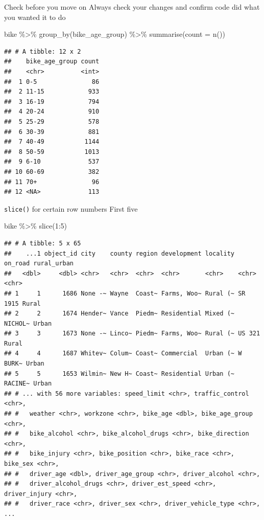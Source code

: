 \documentclass[
  ignorenonframetext,
]{beamer}
\newenvironment{Shaded}{\begin{snugshade}}{\end{snugshade}}
\newcommand{\AttributeTok}[1]{\textcolor[rgb]{0.77,0.63,0.00}{#1}}
\newcommand{\DecValTok}[1]{\textcolor[rgb]{0.00,0.00,0.81}{#1}}
\newcommand{\FunctionTok}[1]{\textcolor[rgb]{0.00,0.00,0.00}{#1}}
\newcommand{\NormalTok}[1]{#1}
\newcommand{\SpecialCharTok}[1]{\textcolor[rgb]{0.00,0.00,0.00}{#1}}
\begin{document}
\begin{frame}[fragile]{Check before you move on}
\protect\hypertarget{check-before-you-move-on}{}
Always check your changes and confirm code did what you wanted it to do

\begin{Shaded}
\begin{Highlighting}[]
\NormalTok{bike }\SpecialCharTok{\%\textgreater{}\%}
  \FunctionTok{group\_by}\NormalTok{(bike\_age\_group) }\SpecialCharTok{\%\textgreater{}\%}
  \FunctionTok{summarise}\NormalTok{(}\AttributeTok{count =} \FunctionTok{n}\NormalTok{())}
\end{Highlighting}
\end{Shaded}

\begin{verbatim}
## # A tibble: 12 x 2
##    bike_age_group count
##    <chr>          <int>
##  1 0-5               86
##  2 11-15            933
##  3 16-19            794
##  4 20-24            910
##  5 25-29            578
##  6 30-39            881
##  7 40-49           1144
##  8 50-59           1013
##  9 6-10             537
## 10 60-69            382
## 11 70+               96
## 12 <NA>             113
\end{verbatim}
\end{frame}

\begin{frame}[fragile]{\texttt{slice()} for certain row numbers}
\protect\hypertarget{slice-for-certain-row-numbers}{}
First five

\begin{Shaded}
\begin{Highlighting}[]
\NormalTok{bike }\SpecialCharTok{\%\textgreater{}\%}
  \FunctionTok{slice}\NormalTok{(}\DecValTok{1}\SpecialCharTok{:}\DecValTok{5}\NormalTok{)}
\end{Highlighting}
\end{Shaded}

\begin{verbatim}
## # A tibble: 5 x 65
##    ...1 object_id city    county region development locality on_road rural_urban
##   <dbl>     <dbl> <chr>   <chr>  <chr>  <chr>       <chr>    <chr>   <chr>      
## 1     1      1686 None -~ Wayne  Coast~ Farms, Woo~ Rural (~ SR 1915 Rural      
## 2     2      1674 Hender~ Vance  Piedm~ Residential Mixed (~ NICHOL~ Urban      
## 3     3      1673 None -~ Linco~ Piedm~ Farms, Woo~ Rural (~ US 321  Rural      
## 4     4      1687 Whitev~ Colum~ Coast~ Commercial  Urban (~ W BURK~ Urban      
## 5     5      1653 Wilmin~ New H~ Coast~ Residential Urban (~ RACINE~ Urban      
## # ... with 56 more variables: speed_limit <chr>, traffic_control <chr>,
## #   weather <chr>, workzone <chr>, bike_age <dbl>, bike_age_group <chr>,
## #   bike_alcohol <chr>, bike_alcohol_drugs <chr>, bike_direction <chr>,
## #   bike_injury <chr>, bike_position <chr>, bike_race <chr>, bike_sex <chr>,
## #   driver_age <dbl>, driver_age_group <chr>, driver_alcohol <chr>,
## #   driver_alcohol_drugs <chr>, driver_est_speed <chr>, driver_injury <chr>,
## #   driver_race <chr>, driver_sex <chr>, driver_vehicle_type <chr>, ...
\end{verbatim}
\end{frame}
\end{document}
